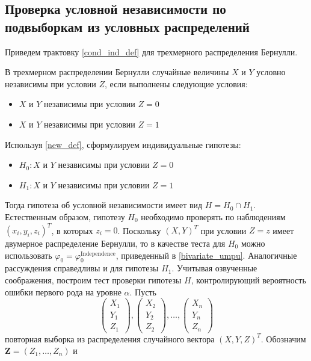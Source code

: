 \newpage
\begin{centering}
    \subsection{Проверка условной независимости по подвыборкам из условных распределений}\label{twos}
\end{centering}

Приведем трактовку \autoref{cond_ind_def} для трехмерного
распределения Бернулли. 
\begin{definition}\label{new_def}
    В трехмерном распределении Бернулли случайные величины $X$ и $Y$
    условно независимы при условии $Z$, 
    если выполнены следующие условия:
    \begin{itemize}
        \item $X$ и $Y$ независимы при условии $Z=0$
        \item $X$ и $Y$  независимы при условии $Z=1$
    \end{itemize}
\end{definition}
Используя \autoref{new_def}, сформулируем индивидуальные гипотезы:
\begin{itemize}
    \item $H_0 : X$ и $Y$ независимы при условии $Z=0$
    \item $H_1 : X$ и $Y$ независимы при условии $Z=1$
\end{itemize}
Тогда гипотеза об условной независимости имеет вид 
$H = H_0 \cap H_1$. Естественным образом, гипотезу 
$H_0$ необходимо проверять по наблюдениям
$(x_i,y_i,z_i)^T$, в которых $z_i=0$. Поскольку $(X,Y)^T$ при условии
$Z=z$ имеет двумерное распределение Бернулли, то
в качестве теста для $H_0$ можно использовать
$\varphi_0 = \varphi^{\text{Independence}}_0$, 
приведенный в \autoref{bivariate_umpu}. Аналогичные рассуждения 
справедливы и для гипотезы $H_1$. Учитывая озвученные соображения,
построим тест проверки гипотезы $H$, контролирующий вероятность
ошибки первого рода на уровне $\alpha$.
Пусть
$$
\begin{pmatrix}
        X_1 \\
        Y_1 \\
        Z_1
    \end{pmatrix},
    \begin{pmatrix}
        X_2 \\
        Y_2 \\
        Z_2
    \end{pmatrix}, \ldots,
    \begin{pmatrix}
        X_n \\
        Y_n \\
        Z_n
    \end{pmatrix}
$$ повторная выборка из распределения случайного вектора $(X,Y,Z)^T$. Обозначим $\mathbf{Z}=(Z_1,\ldots,Z_n)$ и 
